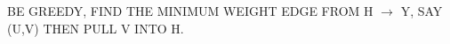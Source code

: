 \documentclass[preview]{standalone}
\begin{document}
\begin{center}
{} BE GREEDY, FIND THE MINIMUM WEIGHT EDGE FROM H $ \rightarrow $ Y, SAY (U,V) THEN PULL V INTO H.
\end{center}
\end{document}
